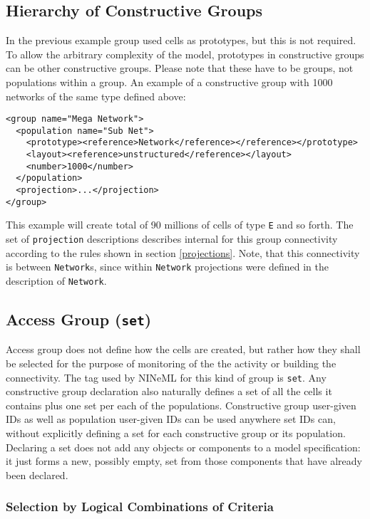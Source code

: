 \documentclass{article}
\begin{document}
\subsection{Hierarchy of Constructive Groups}
\label{groupHierarchy}

In the previous example group used cells as prototypes, but this is not required.
To allow the arbitrary complexity of the model, prototypes in constructive groups
can be other constructive groups. Please note that these have to be groups, not
populations within a group. An example of a constructive group with
1000 networks of the same type defined above:
\begin{verbatim}
<group name="Mega Network">
  <population name="Sub Net">
    <prototype><reference>Network</reference></reference></prototype>
    <layout><reference>unstructured</reference></layout>
    <number>1000</number>
  </population>
  <projection>...</projection>
</group>
\end{verbatim}
This example will create total of 90 millions of cells of type {\tt E}
and so forth. The set of {\tt projection} descriptions describes internal for
this group connectivity according to the rules shown in section \ref{projections}.
Note, that this connectivity is between {\tt Network}s, since within
{\tt Network} projections were defined in the description of {\tt Network}.

\subsection{Access Group ({\tt set})}
\label{accessGroup}

Access group does not define how the cells are created, but rather how they
shall be selected for the purpose of monitoring of the the activity or building
the connectivity. The tag used by NINeML for this kind of group is {\tt set}.
Any constructive group declaration also naturally defines a set of all the
cells it contains plus one set per each of the populations. Constructive group
user-given IDs as well as population user-given IDs can be used anywhere set IDs
can, without explicitly defining a set for each constructive group or its population.
Declaring a set does not add any objects or components to a model specification: it just
forms a new, possibly empty, set from those components that have already been declared.

\subsubsection{Selection by Logical Combinations of Criteria}
\end{document}
